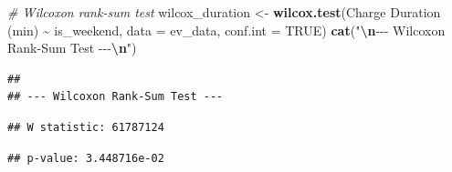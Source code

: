 \documentclass[
  12pt,
]{article}
\newenvironment{Shaded}{\begin{snugshade}}{\end{snugshade}}
\newcommand{\AttributeTok}[1]{\textcolor[rgb]{0.13,0.29,0.53}{#1}}
\newcommand{\CommentTok}[1]{\textcolor[rgb]{0.56,0.35,0.01}{\textit{#1}}}
\newcommand{\ConstantTok}[1]{\textcolor[rgb]{0.56,0.35,0.01}{#1}}
\newcommand{\DecValTok}[1]{\textcolor[rgb]{0.00,0.00,0.81}{#1}}
\newcommand{\FunctionTok}[1]{\textcolor[rgb]{0.13,0.29,0.53}{\textbf{#1}}}
\newcommand{\NormalTok}[1]{#1}
\newcommand{\OtherTok}[1]{\textcolor[rgb]{0.56,0.35,0.01}{#1}}
\newcommand{\SpecialCharTok}[1]{\textcolor[rgb]{0.81,0.36,0.00}{\textbf{#1}}}
\newcommand{\StringTok}[1]{\textcolor[rgb]{0.31,0.60,0.02}{#1}}
\begin{document}
\begin{Shaded}
\begin{Highlighting}[]
\CommentTok{\# Wilcoxon rank{-}sum test}
\NormalTok{wilcox\_duration }\OtherTok{\textless{}{-}} \FunctionTok{wilcox.test}\NormalTok{(}\StringTok{\textasciigrave{}}\AttributeTok{Charge Duration (min)}\StringTok{\textasciigrave{}} \SpecialCharTok{\textasciitilde{}}\NormalTok{ is\_weekend,}
    \AttributeTok{data =}\NormalTok{ ev\_data, }\AttributeTok{conf.int =} \ConstantTok{TRUE}\NormalTok{)}
\FunctionTok{cat}\NormalTok{(}\StringTok{"}\SpecialCharTok{\textbackslash{}n}\StringTok{{-}{-}{-} Wilcoxon Rank{-}Sum Test {-}{-}{-}}\SpecialCharTok{\textbackslash{}n}\StringTok{"}\NormalTok{)}
\end{Highlighting}
\end{Shaded}

\begin{verbatim}
## 
## --- Wilcoxon Rank-Sum Test ---
\end{verbatim}

\begin{Shaded}
\end{Shaded}

\begin{verbatim}
## W statistic: 61787124
\end{verbatim}

\begin{Shaded}
\end{Shaded}

\begin{verbatim}
## p-value: 3.448716e-02
\end{verbatim}

\begin{Shaded}
\end{Shaded}
\end{document}
